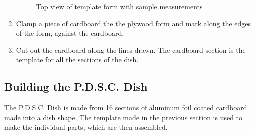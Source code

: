 \documentclass[titlepage]{article}
\begin{document}
\begin{enumerate}
\begin{figure}[!htb]
                      \caption{Top view of template form with sample measurements}\label{fig:awesome_image3}
                    \endminipage
                \end{figure}
                \item Clamp a piece of cardboard the the plywood form and mark along the edges of the form, against the cardboard.
                \item Cut out the cardboard along the lines drawn. The cardboard section is the template for all the sections of the dish.

            \end{enumerate}
            
        \subsection{Building the P.D.S.C. Dish}
            The P.D.S.C. Dish is made from 16 sections of aluminum foil coated cardboard made into a dish shape. The template made in the previous 
            section is used to make the individual parts, which are then assembled.
\end{document}
